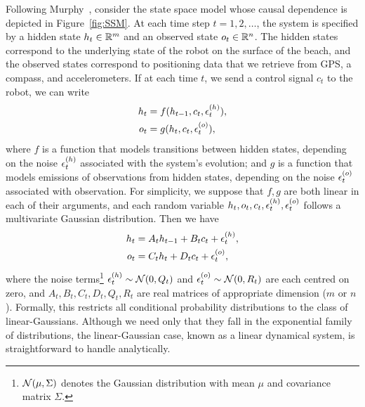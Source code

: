         Following Murphy~\cite{murphy}, consider the state space model whose causal dependence is depicted in Figure~\ref{fig:SSM}.
        At each time step $t = 1, 2, \ldots$, the system is specified by a hidden state $h_t \in \mathbb{R}^{m}$ and an observed state $o_t \in \mathbb{R}^{n}$.
        The hidden states correspond to the underlying state of the robot on the surface of the beach, and the observed states correspond to positioning data that we retrieve from GPS, a compass, and accelerometers.
        If at each time $t$, we send a control signal $c_t$ to the robot, we can write
        \begin{align}
            h_t &= f(h_{t-1}, c_t, \epsilon^{(h)}_t), \\
            o_t &= g(h_{t}, c_t, \epsilon^{(o)}_t),
        \end{align}
        where $f$ is a function that models transitions between hidden states, depending on the noise $\epsilon^{(h)}_t$ associated with the system's evolution; and $g$ is a function that models emissions of observations from hidden states, depending on the noise $\epsilon^{(o)}_t$ associated with observation.
        For simplicity, we suppose that $f,g$ are both linear in each of their arguments, and each random variable $h_t, o_t, c_t, \epsilon^{(h)}_t, \epsilon^{(o)}_t$ follows a multivariate Gaussian distribution.
        Then we have
        \begin{align}
            h_t &= A_t h_{t-1} + B_t c_t + \epsilon^{(h)}_t, \\
            o_t &= C_t h_{t} + D_t c_t + \epsilon^{(o)}_t,
        \end{align}
        where the noise terms\footnote{$\mathcal{N}(\mu, \Sigma)$ denotes the Gaussian distribution with mean $\mu$ and covariance matrix $\Sigma$.} $\epsilon^{(h)}_t \sim \mathcal{N}(0, Q_t)$ and $\epsilon^{(o)}_t \sim \mathcal{N}(0, R_t)$ are each centred on zero, and $A_t, B_t, C_t, D_t, Q_t, R_t$ are real matrices of appropriate dimension ($m$ or $n$).
        Formally, this restricts all conditional probability distributions to the class of linear-Gaussians.
        Although we need only that they fall in the exponential family of distributions, the linear-Gaussian case, known as a linear dynamical system, is straightforward to handle analytically.


